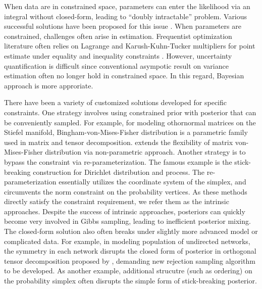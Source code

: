 \documentclass[10pt]{article}
\DeclareMathOperator{\1}{\mathbbm{1}}
\begin{document}
When data are in constrained space, parameters can enter the likelihood via an integral without closed-form, leading to ``doubly intractable'' problem. Various successful solutions have been proposed for this issue \citep{murray2012mcmc,rao2016data}. When parameters are constrained, challenges often arise in estimation. Frequentist optimization literature often relies on Lagrange and Karush-Kuhn-Tucker multipliers for point estimate under equality and inequality constraints \citep{boyd2004convex}. However, uncertainty quantification is difficult since conventional asympotic result on variance estimation often no longer hold in constrained space. In this regard, Bayesian approach is more approriate.

There have been a variety of customized solutions developed for specific constraints. One strategy involves using constrained prior with posterior that can be conveniently sampled. For example, for modeling othornormal matrices on the Stiefel manifold, Bingham-von-Mises-Fisher distribution \citep{khatri1977mises,hoff2009simulation} is a parametric family used in matrix and tensor decomposition. \cite{lin2016bayesstiefel} extends the flexibility of matrix von-Mises-Fisher distribution via non-parametric approach. Another strategy is to bypass the constraint via re-parameterization. The famous example is the stick-breaking construction for Dirichlet distribution and process. The re-parameterization essentially utilizes the coordinate system of the simplex, and circumvents the norm constraint on the probability vertices. As these methods directly satisfy the constraint requirement, we refer them as the intrinsic approaches. Despite the success of intrinsic approaches,  posteriors can quickly become very involved in Gibbs sampling, leading to inefficient posterior mixing. The closed-form solution also often breaks under slightly more advanced model or complicated data. For example, in modeling population of undirected networks, the symmetry in each network disrupts the closed form of posterior in orthogonal tensor decomposition proposed by \cite{hoff2016equivariant}, demanding new rejection sampling algorithm to be developed. As another example, additional strucutre (such as ordering) on the probability simplex often disrupts the simple form of stick-breaking posterior.
\end{document}
